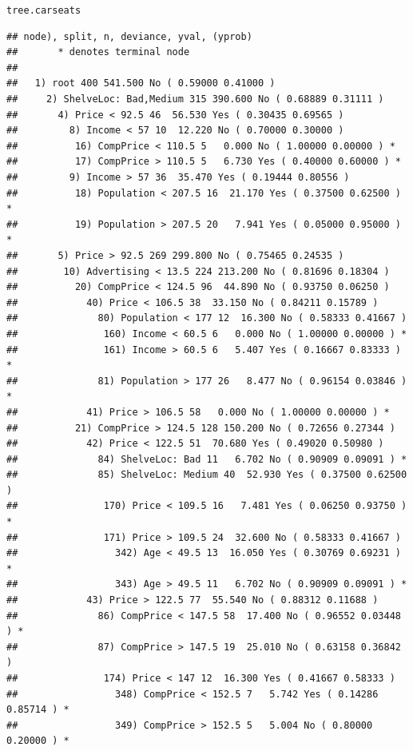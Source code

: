\documentclass[12pt]{article}\usepackage[]{graphicx}\usepackage[]{color}
\makeatletter
\newcommand{\hlstd}[1]{\textcolor[rgb]{0.345,0.345,0.345}{#1}}%
\newenvironment{kframe}{%
 \def\at@end@of@kframe{}%
 \ifinner\ifhmode%
  \def\at@end@of@kframe{\end{minipage}}%
  \begin{minipage}{\columnwidth}%
 \fi\fi%
 \def\FrameCommand##1{\hskip\@totalleftmargin \hskip-\fboxsep
 \colorbox{shadecolor}{##1}\hskip-\fboxsep
     \hskip-\linewidth \hskip-\@totalleftmargin \hskip\columnwidth}%
 \MakeFramed {\advance\hsize-\width
   \@totalleftmargin\z@ \linewidth\hsize
   \@setminipage}}%
 {\par\unskip\endMakeFramed%
 \at@end@of@kframe}
\newenvironment{knitrout}{}{} %
\makeatother
\begin{document}
\begin{knitrout}
\color{fgcolor}\begin{kframe}
\begin{alltt}
\hlstd{tree.carseats}
\end{alltt}
\begin{verbatim}
## node), split, n, deviance, yval, (yprob)
##       * denotes terminal node
## 
##   1) root 400 541.500 No ( 0.59000 0.41000 )  
##     2) ShelveLoc: Bad,Medium 315 390.600 No ( 0.68889 0.31111 )  
##       4) Price < 92.5 46  56.530 Yes ( 0.30435 0.69565 )  
##         8) Income < 57 10  12.220 No ( 0.70000 0.30000 )  
##          16) CompPrice < 110.5 5   0.000 No ( 1.00000 0.00000 ) *
##          17) CompPrice > 110.5 5   6.730 Yes ( 0.40000 0.60000 ) *
##         9) Income > 57 36  35.470 Yes ( 0.19444 0.80556 )  
##          18) Population < 207.5 16  21.170 Yes ( 0.37500 0.62500 ) *
##          19) Population > 207.5 20   7.941 Yes ( 0.05000 0.95000 ) *
##       5) Price > 92.5 269 299.800 No ( 0.75465 0.24535 )  
##        10) Advertising < 13.5 224 213.200 No ( 0.81696 0.18304 )  
##          20) CompPrice < 124.5 96  44.890 No ( 0.93750 0.06250 )  
##            40) Price < 106.5 38  33.150 No ( 0.84211 0.15789 )  
##              80) Population < 177 12  16.300 No ( 0.58333 0.41667 )  
##               160) Income < 60.5 6   0.000 No ( 1.00000 0.00000 ) *
##               161) Income > 60.5 6   5.407 Yes ( 0.16667 0.83333 ) *
##              81) Population > 177 26   8.477 No ( 0.96154 0.03846 ) *
##            41) Price > 106.5 58   0.000 No ( 1.00000 0.00000 ) *
##          21) CompPrice > 124.5 128 150.200 No ( 0.72656 0.27344 )  
##            42) Price < 122.5 51  70.680 Yes ( 0.49020 0.50980 )  
##              84) ShelveLoc: Bad 11   6.702 No ( 0.90909 0.09091 ) *
##              85) ShelveLoc: Medium 40  52.930 Yes ( 0.37500 0.62500 )  
##               170) Price < 109.5 16   7.481 Yes ( 0.06250 0.93750 ) *
##               171) Price > 109.5 24  32.600 No ( 0.58333 0.41667 )  
##                 342) Age < 49.5 13  16.050 Yes ( 0.30769 0.69231 ) *
##                 343) Age > 49.5 11   6.702 No ( 0.90909 0.09091 ) *
##            43) Price > 122.5 77  55.540 No ( 0.88312 0.11688 )  
##              86) CompPrice < 147.5 58  17.400 No ( 0.96552 0.03448 ) *
##              87) CompPrice > 147.5 19  25.010 No ( 0.63158 0.36842 )  
##               174) Price < 147 12  16.300 Yes ( 0.41667 0.58333 )  
##                 348) CompPrice < 152.5 7   5.742 Yes ( 0.14286 0.85714 ) *
##                 349) CompPrice > 152.5 5   5.004 No ( 0.80000 0.20000 ) *

\end{verbatim}
\end{kframe}
\end{knitrout}
\end{document}
